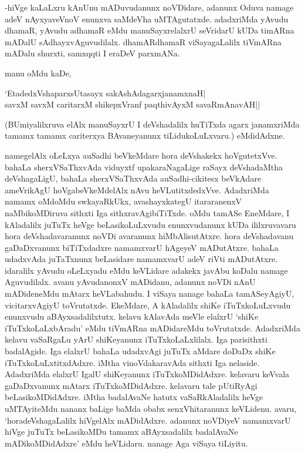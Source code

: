 -hiVge kaLaLxru kAnUnu mADuvudanunx noVDidare, adanunx Oduva namage adeV nAyxyaveVnoV enunxva saMdeVha uMTAgutatxde. adadxriMda yAvudu dhamaR, yAvudu adhamaR eMdu manuSayxrelalxrU seVridarU kUDa timARna mADalU sAdhayxvAguvudilalx. dhamARdhamaR viSayagaLalilx tiVmARna mADalu shurxti, samxqqti I eraDeV parxmANa. 

manu oMdu kaDe,

\begin{shloka}
`EtadedxVshaparxsUtasayx sakAshAdagarxjanamxnaH|\\
savxM savxM caritarxM shikepxVranf paqthivAyxM savaRmAnavAH||
\end{shloka}

(BUmiyalilxruva elAlx manuSayxrU I deVshadalilx huTiTxda agarx janamxriMda tamamx tamamx cariterxya BAvaneyanunx tiLidukoLuLxvaru.) eMdidAdxne.

namegelAlx oLeLxya auSadhi beVkeMdare hora deVshakekx hoVgutetxVve. bahaLa sherxVSaThxvAda viduyxtf upakaraNagaLige raSayx deVshadaMtha deVshagaLigU, bahaLa sherxVSaThxvAda auSadhi-cikitesx beVkAdare ameVrikAgU hoVgabeVkeMdelAlx nAvu heVLutitxdedxVve. AdadxriMda namamx oMdoMdu swkayaRkUkx, avashayxkategU itararanenxV naMbikoMDiruva sithxti Iga sithxravAgibiTiTxde. oMdu tamASe EneMdare, I kAladalilx juTuTx heVge beLasikoLuLxvudu enunxvudanunx kUDa ililxruvavaru hora deVshadavaranunx noVDi avaranunx hiMbAlisutAtxre. hora deVshadavanu gaDaDxvanunx biTiTxdadxre namamxvarU hAgeyeV mADutAtxre. bahaLa udadxvAda juTaTxnunx beLasidare namamxvarU adeV riVti mADutAtxre. idaralilx yAvudu oLeLxyadu eMdu keVLidare adakekx javAbu koDalu namage Aguvudilalx. avanu yAvudanonxV mADidanu, adanunx noVDi nAnU mADideneMdu mAtarx heVLabahudu. I viSaya nanage bahaLa tamASeyAgiyU, vicitarxvAgiyU toVrutatxde. EkeMdare, A kAladalilx shiKe iTuTxkoLuLxvudu enunxvudu aBAyxsadalilxtutx. kelavu kAlavAda meVle elalxrU `shiKe iTuTxkoLaLxbAradu' eMdu tiVmARna mADidareMdu toVrutatxde. AdadxriMda kelavu vaSaRgaLu yArU shiKeyanunx iTuTxkoLaLxlilalx. Iga parisithxti badalAgide. Iga elalxrU bahaLa udadxvAgi juTuTx aMdare doDaDx shiKe iTuTxkoLuLxtitxdAdxre. iMtha vinoVdakaravAda sithxti Iga nelaside. AdadxriMda elalxrU IgalU shiKeyanunx iTuTxkoMDidAdxre. kelavaru keVvala gaDaDxvanunx mAtarx iTuTxkoMDidAdxre. kelavaru tale pUtiRyAgi beLasikoMDidAdxre. iMtha badalAvaNe hatutx vaSaRkAladalilx heVge uMTAyiteMdu nananx baLige baMda obabx senxVhitaranunx keVLidenu. avaru, `horadeVshagaLalilx hiVgelAlx mADidAdxre. adanunx noVDiyeV namamxvarU hiVge juTuTx beLasikoMDu tamamx aBAyxsadalilx badalAvaNe mADikoMDidAdxre' eMdu heVLidaru. nanage Aga viSaya tiLiyitu. 

